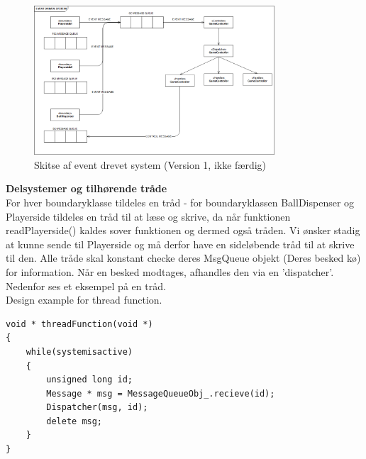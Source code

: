 \documentclass[Softwaredesign/Softwaredesign_main.tex]{subfiles}
\begin{document}
\begin{figure}[H]
    \centering
    \includegraphics[width=0.8\textwidth]{Softwaredesign/RPiApp/graphic_RPi/EDS.png}
    \caption{Skitse af event drevet system (Version 1, ikke færdig)}
    \label{fig:EDS}
\end{figure}

\textbf{Delsystemer og tilhørende tråde}
\\For hver boundaryklasse tildeles en tråd - for boundaryklassen BallDispenser og Playerside tildeles en tråd til at læse og skrive, da når funktionen readPlayerside() kaldes sover funktionen og dermed også tråden. Vi ønsker stadig at kunne sende til Playerside og må derfor have en sideløbende tråd til at skrive til den. Alle tråde skal konstant checke deres MsgQueue objekt (Deres besked kø) for information. Når en besked modtages, afhandles den via en 'dispatcher'. Nedenfor ses et eksempel på en tråd.
\\Design example for thread function. 
\begin{lstlisting}
void * threadFunction(void *)
{
    while(systemisactive)
    {
        unsigned long id;
        Message * msg = MessageQueueObj_.recieve(id);
        Dispatcher(msg, id);
        delete msg; 
    }
}
\end{lstlisting}
\end{document}
